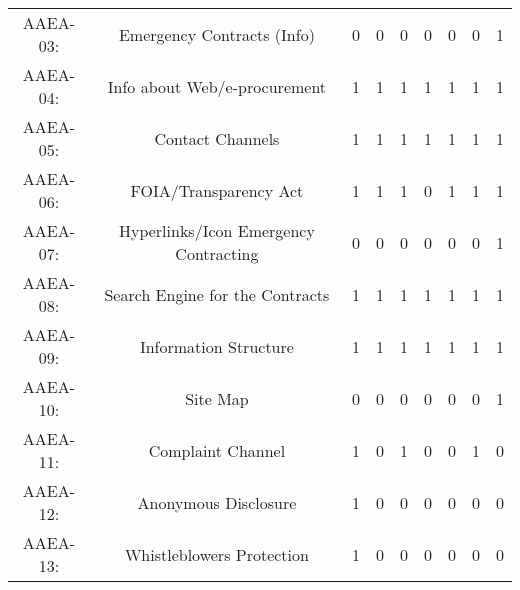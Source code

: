 \documentclass[a4paper, twoside]{report}
\begin{document}
\begin{table}[htbp]
\begin{adjustbox}{max width=\linewidth}
\begin{tabular}{rcccccccc}
    \multicolumn{1}{c}{AAEA-03:} & \multicolumn{1}{p{19em}}{\cellcolor[rgb]{ .749,  .749,  .749}Emergency Contracts (Info)} & \cellcolor[rgb]{ .749,  .749,  .749}0 & \cellcolor[rgb]{ .749,  .749,  .749}0 & \cellcolor[rgb]{ .749,  .749,  .749}0 & \cellcolor[rgb]{ .749,  .749,  .749}0 & \cellcolor[rgb]{ .749,  .749,  .749}0 & \cellcolor[rgb]{ .749,  .749,  .749}0 & \cellcolor[rgb]{ .749,  .749,  .749}1 \\
    \multicolumn{1}{c}{AAEA-04:} & \multicolumn{1}{p{19em}}{Info about Web/e-procurement} & 1     & 1     & 1     & 1     & 1     & 1     & 1 \\
    \multicolumn{1}{c}{AAEA-05:} & \multicolumn{1}{p{19em}}{Contact Channels} & 1     & 1     & 1     & 1     & 1     & 1     & 1 \\
    \multicolumn{1}{c}{AAEA-06:} & \multicolumn{1}{p{19em}}{FOIA/Transparency Act} & 1     & 1     & 1     & 0     & 1     & 1     & 1 \\
    \multicolumn{1}{c}{AAEA-07:} & \multicolumn{1}{p{19em}}{\cellcolor[rgb]{ .749,  .749,  .749}Hyperlinks/Icon Emergency Contracting} & \cellcolor[rgb]{ .749,  .749,  .749}0 & \cellcolor[rgb]{ .749,  .749,  .749}0 & \cellcolor[rgb]{ .749,  .749,  .749}0 & \cellcolor[rgb]{ .749,  .749,  .749}0 & \cellcolor[rgb]{ .749,  .749,  .749}0 & \cellcolor[rgb]{ .749,  .749,  .749}0 & \cellcolor[rgb]{ .749,  .749,  .749}1 \\
    \multicolumn{1}{c}{AAEA-08:} & \multicolumn{1}{p{19em}}{Search Engine for the Contracts} & 1     & 1     & 1     & 1     & 1     & 1     & 1 \\
    \multicolumn{1}{c}{AAEA-09:} & \multicolumn{1}{p{19em}}{Information Structure} & 1     & 1     & 1     & 1     & 1     & 1     & 1 \\
    \multicolumn{1}{c}{AAEA-10:} & \multicolumn{1}{p{19em}}{Site Map} & 0     & 0     & 0     & 0     & 0     & 0     & 1 \\
    \multicolumn{1}{c}{AAEA-11:} & \multicolumn{1}{p{19em}}{Complaint Channel} & 1     & 0     & 1     & 0     & 0     & 1     & 0 \\
    \multicolumn{1}{c}{AAEA-12:} & \multicolumn{1}{p{19em}}{\cellcolor[rgb]{ .749,  .749,  .749}Anonymous Disclosure} & \cellcolor[rgb]{ .749,  .749,  .749}1 & \cellcolor[rgb]{ .749,  .749,  .749}0 & \cellcolor[rgb]{ .749,  .749,  .749}0 & \cellcolor[rgb]{ .749,  .749,  .749}0 & \cellcolor[rgb]{ .749,  .749,  .749}0 & \cellcolor[rgb]{ .749,  .749,  .749}0 & \cellcolor[rgb]{ .749,  .749,  .749}0 \\
    \multicolumn{1}{c}{AAEA-13:} & \multicolumn{1}{p{19em}}{Whistleblowers Protection} & 1     & 0     & 0     & 0     & 0     & 0     & 0 \\

\end{tabular}
\end{adjustbox}
\end{table}
\end{document}
